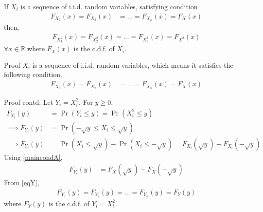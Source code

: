 \documentclass{beamer}
\providecommand{\pr}[1]{\ensuremath{\Pr\left(#1\right)}}
\begin{document}
\begin{frame}{}
    \begin{lemma} \label{lmaconda}
    If $X_i$ is a sequence of i.i.d. random variables, satisfying condition
    \begin{align}
        F_{X_1}(x)=F_{X_2}(x)&=\ldots=F_{X_n}(x)=F_X(x)
    \end{align}
    then,
    \begin{align}
        F_{X_1^2}(x)=F_{X_2^2}(x)=\ldots=F_{X_n^2}(x)=F_{X^2}(x)
    \end{align}
    $\forall x \in \mathbb{R}$ where $F_{X}(x)$ is the c.d.f. of $X_i$.
\end{lemma}
\begin{block}{Proof}
${X_i}$ is a sequence of i.i.d. random variables, which means it satisfies the following condition.
\begin{align}
        F_{X_1}(x)=F_{X_2}(x)&=\ldots=F_{X_n}(x)=F_X(x) \label{maincondA}
\end{align}
\end{block}
\end{frame}
\begin{frame}
\begin{block}{Proof contd.}
Let $Y_i=X_i^2$. For $y \geq 0$,
\begin{align}
    F_{Y_i}(y)&=\pr{Y_i \leq y}=\pr{X_i^2 \leq y}\\
    \implies F_{Y_i}(y)&=\pr{-\sqrt{y} \leq X_i \leq \sqrt{y}}\label{eqref}\\
    \implies F_{Y_i}(y)&=\pr{X_i \leq \sqrt{y}}-\pr{X_i \leq-\sqrt{y}}=F_{X_i}(\sqrt{y})-F_{X_i}(-\sqrt{y})
\end{align}
Using \eqref{maincondA},
\begin{align} 
    F_{Y_i}(y)&=F_X(\sqrt{y})-F_X(-\sqrt{y})\label{eqY}
\end{align}
From \eqref{eqY},
\begin{align} 
    F_{Y_1}(y)=F_{Y_2}(y)=\ldots=F_{Y_n}(y)=F_Y(y)\label{condnA}
\end{align}
where $F_Y(y)$ is the c.d.f. of $Y_i=X_i^2$.
\end{block}
\end{frame}
\end{document}
